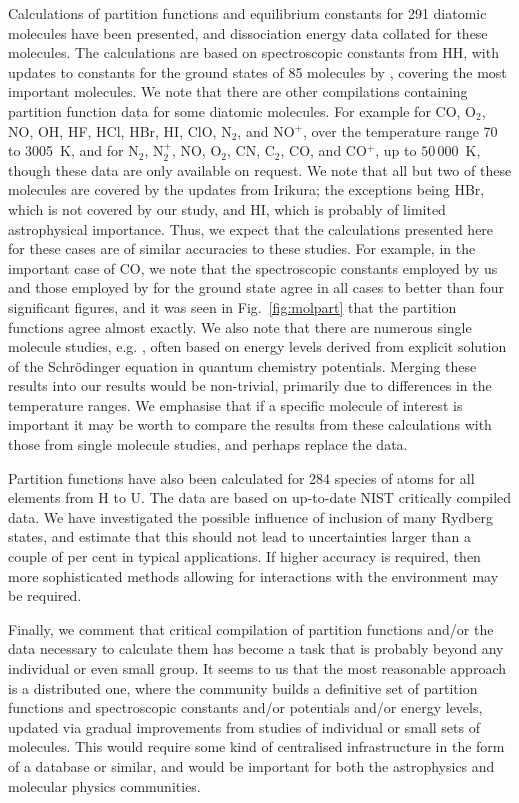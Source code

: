 \documentclass[traditabstract]{aa} %
\begin{document}
Calculations of partition functions and equilibrium constants for 291 diatomic molecules have been presented, and dissociation energy data collated for these molecules.  The calculations are based on spectroscopic constants from HH, with updates to constants for the ground states of 85 molecules by \cite{2007JPCRD..36..389I, 2009JPCRD..38..749I}, covering the most important molecules.  We note that there are other compilations containing partition function data for some diatomic molecules.  For example \cite{2000JMoSt.517..407G} for CO, O$_2$, NO, OH, HF, HCl, HBr, HI, ClO, N$_2$, and NO$^+$, over the temperature range 70 to 3005~K, and \cite{2009IJT....30..416B} for N$_2$, N$_2^+$, NO, O$_2$, CN, C$_2$, CO, and CO$^+$, up to $50\,000$~K, though these data are only available on request.  We note that all but two of these molecules are covered by the updates from Irikura; the exceptions being HBr, which is not covered by our study, and HI, which is probably of limited astrophysical importance.  Thus, we expect that the calculations presented here for these cases are of similar accuracies to these studies.  For example, in the important case of CO, we note that the spectroscopic constants employed by us and those employed by \cite{2009IJT....30..416B} for the ground state agree in all cases to better than four significant figures, and it was seen in Fig.~\ref{fig:molpart} that the partition functions agree almost exactly.  We also note that there are numerous single molecule studies, e.g. \citet{1996JQSRT..55..849S,2005MNRAS.357..471E}, often based on energy levels derived from explicit solution of the Schr\"odinger equation in quantum chemistry potentials.  Merging these results into our results would be non-trivial, primarily due to differences in the temperature ranges.  We emphasise that if a specific molecule of interest is important it may be worth to compare the results from these calculations with those from single molecule studies, and perhaps replace the data.

Partition functions have also been calculated for 284 species of atoms for all elements from H to U.  The data are based on up-to-date NIST critically compiled data.  We have investigated the possible influence of inclusion of many Rydberg states, and estimate that this should not lead to uncertainties larger than a couple of per cent in typical applications.  If higher accuracy is required, then more sophisticated methods allowing for interactions with the environment may be required.  

Finally, we comment that critical compilation of partition functions and/or the data necessary to calculate them has become a task that is probably beyond any individual or even small group.  It seems to us that the most reasonable approach is a distributed one, where the community builds a definitive set of partition functions and spectroscopic constants and/or potentials and/or energy levels, updated via gradual improvements from studies of individual or small sets of molecules.  This would require some kind of centralised infrastructure in the form of a database or similar, and would be important for both the astrophysics and molecular physics communities.
\end{document}

